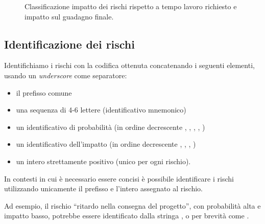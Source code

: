 \documentclass[10pt]{softeng} %
\begin{document}
\begin{figure}
	\caption{Classificazione impatto dei rischi rispetto a tempo lavoro richiesto e impatto sul guadagno finale.}
	\label{fig:rappresentazione_impatto}
\end{figure}

\subsection{Identificazione dei rischi}

Identifichiamo i rischi con la codifica ottenuta concatenando i seguenti elementi, usando un \emph{underscore} come separatore:
\begin{itemize}
	\item il prefisso comune 
	\item una sequenza di 4-6 lettere (identificativo mnemonico)
	\item un identificativo di probabilit\`a (in ordine decrescente , , , , )
	\item un identificativo dell'impatto (in ordine decrescente , , , )
	\item un intero strettamente positivo (unico per ogni rischio).
\end{itemize}
In contesti in cui \`e necessario essere concisi \`e possibile identificare i rischi utilizzando unicamente il prefisso  e l'intero assegnato al rischio.

Ad esempio, il rischio ``ritardo nella consegna del progetto'', con probabilit\`a alta e impatto basso, potrebbe essere identificato dalla stringa , o per brevit\`a come .
\end{document}
